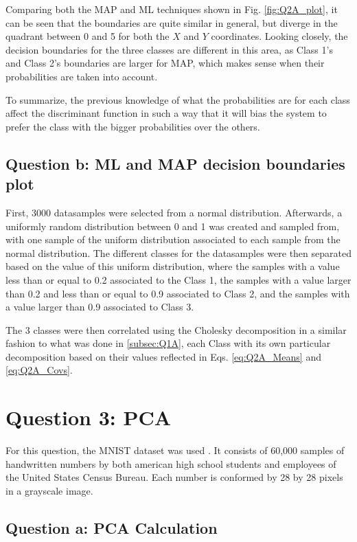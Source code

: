 \documentclass{article}
\begin{document}
Comparing both the MAP and ML techniques shown in Fig. \ref{fig:Q2A_plot}, it can be seen that the boundaries are quite similar in general, but diverge in the quadrant between 0 and 5 for both the $X$ and $Y$ coordinates. Looking closely, the decision boundaries for the three classes are different in this area, as Class 1's and Class 2's boundaries are larger for MAP, which makes sense when their probabilities are taken into account. 

To summarize, the previous knowledge of what the probabilities are for each class affect the discriminant function in such a way that it will bias the system to prefer the class with the bigger probabilities over the others.

\subsection{Question b: ML and MAP decision boundaries plot}
\label{subsec:Q2B}
First, 3000 datasamples were selected from a normal distribution. Afterwards, a uniformly random distribution between 0 and 1 was created and sampled from, with one sample of the uniform distribution associated to each sample from the normal distribution. The different classes for the datasamples were then separated based on the value of this uniform distribution, where the samples with a value less than or equal to 0.2 associated to the Class 1, the samples with a value larger than 0.2 and less than or equal to 0.9 associated to Class 2, and the samples with a value larger than 0.9 associated to Class 3.

The 3 classes were then correlated using the Cholesky decomposition in a similar fashion to what was done in \ref{subsec:Q1A}, each Class with its own particular decomposition based on their values reflected in Eqs. \ref{eq:Q2A_Means} and \ref{eq:Q2A_Covs}.

\section{Question 3: PCA}
For this question, the MNIST dataset was used \cite{MNIST_dataset}. It consists of 60,000 samples of handwritten numbers by both american high school students and employees of the United States Census Bureau. Each number is conformed by 28 by 28 pixels in a grayscale image.
\subsection{Question a: PCA Calculation}
\label{subsec:Q3A}
    
\end{document}
